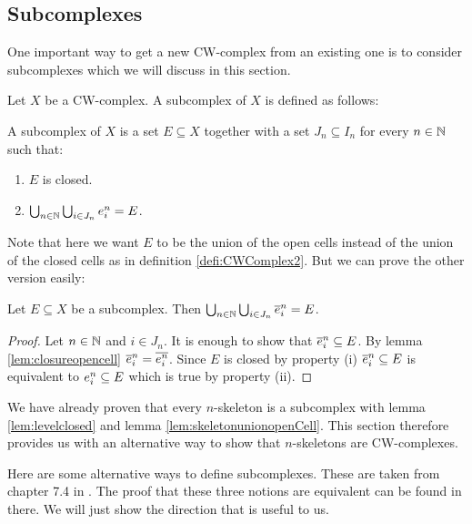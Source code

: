 \subsection{Subcomplexes}

One important way to get a new CW-complex from an existing one is to consider subcomplexes which we will discuss in this section. 

Let $X$ be a CW-complex. A subcomplex of $X$ is defined as follows:

\begin{defi} \label{defi:subcomplex}
    A subcomplex of $X$ is a set $E \subseteq X$ together with a set $J_n \subseteq I_n$ for every $n \in \bN$ such that:
    \begin{enumerate}
        \item $E$ is closed.
        \item $\bigcup_{n \in \bN} \bigcup_{i \in J_n} \openCell{n}{i} = E$.
    \end{enumerate}
\end{defi}

Note that here we want $E$ to be the union of the open cells instead of the union of the closed cells as in definition \ref{defi:CWComplex2}. 
But we can prove the other version easily: 

\begin{lem} \label{lem:subcomplexunionclosed}
    Let $E \subseteq X$ be a subcomplex. 
    Then $\bigcup_{n \in \bN} \bigcup_{i \in J_n} \closedCell{n}{i} = E$.
\end{lem}
\begin{proof}
    Let $n \in \bN$ and $i \in J_n$. 
    It is enough to show that $\closedCell{n}{i} \subseteq E$. 
    By lemma \ref{lem:closureopencell} $\closedCell{n}{i} = \closure{\openCell{n}{i}}$. 
    Since $E$ is closed by property (i) $\closedCell{n}{i} \subseteq E$ is equivalent to $\openCell{n}{i} \subseteq E$ which is true by property (ii).
\end{proof}

\begin{example}
    We have already proven that every $n$-skeleton is a subcomplex with lemma \ref{lem:levelclosed} and lemma \ref{lem:skeletonunionopenCell}. 
    This section therefore provides us with an alternative way to show that $n$-skeletons are CW-complexes.
\end{example}

Here are some alternative ways to define subcomplexes. 
These are taken from chapter 7.4 in \cite{Jänich2001}.
The proof that these three notions are equivalent can be found in there. 
We will just show the direction that is useful to us. 

